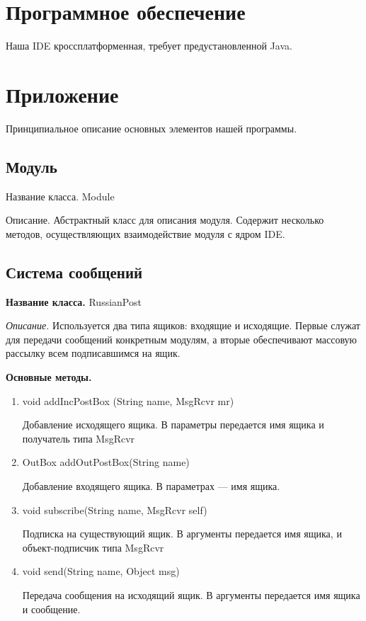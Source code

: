 \documentclass[12pt]{article}
\begin{document}
\section{Программное обеспечение}
Наша IDE кроссплатформенная, требует предустановленной Java. 

\section{Приложение}
Принципиальное описание основных элементов нашей программы.

\subsection{Модуль}
Название класса. Module

Описание. Абстрактный класс для описания модуля. Содержит несколько методов, осуществляющих взаимодействие модуля с ядром IDE.


\subsection{Система сообщений}

{\bf Название класса.} RussianPost

\textit{Описание.} Используется два типа ящиков: входящие и исходящие. Первые служат для передачи сообщений конкретным модулям, а вторые обеспечивают массовую рассылку всем подписавшимся на ящик.

\textbf{Основные методы.} 

\begin{enumerate}

\item void addIncPostBox (String name, MsgRcvr mr)

Добавление исходящего ящика. В параметры передается имя ящика и получатель типа MsgRcvr
\item OutBox addOutPostBox(String name)

Добавление входящего ящика. В параметрах --- имя ящика.
\item void subscribe(String name, MsgRcvr self)

Подписка на существующий ящик. В аргументы передается имя ящика, и объект-подписчик типа MsgRcvr 
\item void send(String name, Object msg)

Передача сообщения на исходящий ящик. В аргументы передается имя ящика и сообщение.
\end{enumerate}
\end{document}
